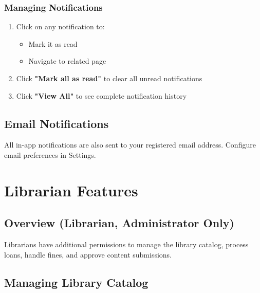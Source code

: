 \documentclass[12pt,a4paper]{article}
\begin{document}
\subsubsection{Managing Notifications}
\begin{enumerate}[leftmargin=*]
    \item Click on any notification to:
        \begin{itemize}
            \item Mark it as read
            \item Navigate to related page
        \end{itemize}
    \item Click \textbf{"Mark all as read"} to clear all unread notifications
    \item Click \textbf{"View All"} to see complete notification history
\end{enumerate}

\subsection{Email Notifications}
All in-app notifications are also sent to your registered email address. Configure email preferences in Settings.

\newpage

\section{Librarian Features}

\subsection{Overview (Librarian, Administrator Only)}
Librarians have additional permissions to manage the library catalog, process loans, handle fines, and approve content submissions.

\subsection{Managing Library Catalog}
\end{document}
